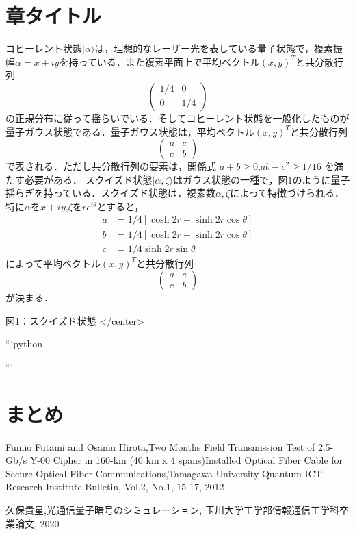 \documentclass[a4j,twocolumn]{jarticle}
\begin{document}
\section{章タイトル}
コヒーレント状態$|\alpha\rangle$は，理想的なレーザー光を表している量子状態で，複素振幅$\alpha=x+iy$を持っている．また複素平面上で平均ベクトル$(x,y)^T$と共分散行列
$$
\begin{pmatrix}
1/4&0\\
0&1/4
\end{pmatrix}
$$
の正規分布に従って揺らいでいる．そしてコヒーレント状態を一般化したものが量子ガウス状態である．量子ガウス状態は，平均ベクトル$(x,y)^T$と共分散行列
$$
\begin{pmatrix}
a&c\\
c&b
\end{pmatrix}
$$
で表される．ただし共分散行列の要素は，関係式
$a+b\geq 0$,$ab-c^2\geq1/16$
を満たす必要がある．
スクイズド状態$|\alpha,\zeta\rangle$はガウス状態の一種で，図1のように量子揺らぎを持っている．スクイズド状態は，複素数$\alpha,\zeta$によって特徴づけられる．特に$\alpha$を$x+iy$,$\zeta$を$re^{i\theta}$とすると，
\begin{equation}
\begin{split}
a&=1/4[\cosh 2r-\sinh 2r\cos\theta]\\
b&=1/4[\cosh 2r+\sinh 2r\cos\theta]\\
c&=1/4\sinh 2r\sin\theta
\end{split}
\end{equation}
によって平均ベクトル$(x,y)^T$と共分散行列
\begin{equation}
\begin{pmatrix}
a&c\\
c&b
\end{pmatrix}
\end{equation}
が決まる．

図1：スクイズド状態
</center>
　



```python

```







\section{まとめ}



\begin{thebibliography}{9}
Fumio Futami and Osamu Hirota,Two Months Field
Transmission Test of 2.5-Gb/s Y-00 Cipher in 160-km (40 km x 4
spans)Installed Optical Fiber Cable for Secure Optical Fiber Communications,Tamagawa University Quantum ICT Research Institute Bulletin, Vol.2, No.1, 15-17, 2012 

久保貴星,光通信量子暗号のシミュレーション, 玉川大学工学部情報通信工学科卒業論文, 2020 
\end{thebibliography}
\end{document}
